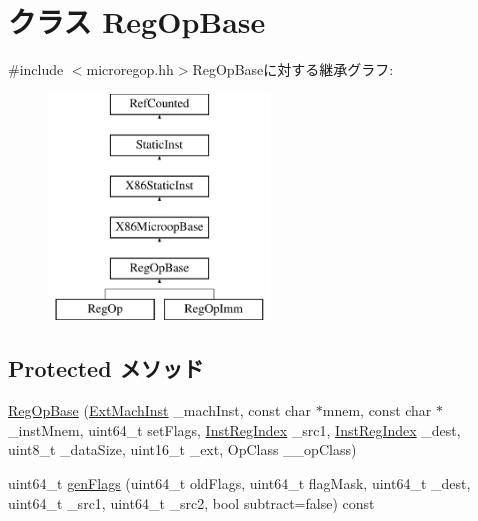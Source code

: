 \hypertarget{classX86ISA_1_1RegOpBase}{
\section{クラス RegOpBase}
\label{classX86ISA_1_1RegOpBase}
}


{\ttfamily \#include $<$microregop.hh$>$}RegOpBaseに対する継承グラフ:\begin{figure}[H]
\begin{center}
\leavevmode
\includegraphics[height=6cm]{classX86ISA_1_1RegOpBase}
\end{center}
\end{figure}
\subsection*{Protected メソッド}
\begin{DoxyCompactItemize}
\item 
\hyperlink{classX86ISA_1_1RegOpBase_ad7c88ff8f34220cd01fb7989aa8ddd11}{RegOpBase} (\hyperlink{structX86ISA_1_1ExtMachInst}{ExtMachInst} \_\-machInst, const char $\ast$mnem, const char $\ast$\_\-instMnem, uint64\_\-t setFlags, \hyperlink{structX86ISA_1_1InstRegIndex}{InstRegIndex} \_\-src1, \hyperlink{structX86ISA_1_1InstRegIndex}{InstRegIndex} \_\-dest, uint8\_\-t \_\-dataSize, uint16\_\-t \_\-ext, OpClass \_\-\_\-opClass)
\item 
uint64\_\-t \hyperlink{classX86ISA_1_1RegOpBase_a19668781839109586f199936333ef8c6}{genFlags} (uint64\_\-t oldFlags, uint64\_\-t flagMask, uint64\_\-t \_\-dest, uint64\_\-t \_\-src1, uint64\_\-t \_\-src2, bool subtract=false) const 
\end{DoxyCompactItemize}
